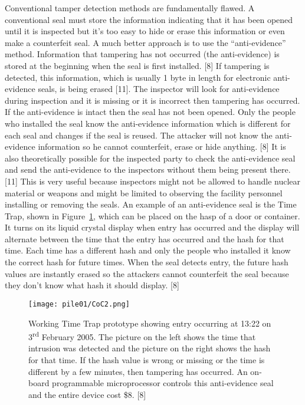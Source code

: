 \documentclass[twocolumn,a4paper]{article}
\begin{document}
Conventional tamper detection methods are fundamentally flawed. A
conventional seal must store the information indicating that it has
been opened until it is inspected but it’s too easy to hide or erase
this information or even make a counterfeit seal. A much better
approach is to use the ``anti-evidence'' method. Information that
tampering has not occurred (the anti-evidence) is stored at the
beginning when the seal is first installed. [8] If tampering is
detected, this information, which is usually 1 byte in length for
electronic anti-evidence seals, is being erased [11].  The inspector
will look for anti-evidence during inspection and it is missing or it
is incorrect then tampering has occurred. If the anti-evidence is
intact then the seal has not been opened. Only the people who
installed the seal know the anti-evidence information which is
different for each seal and changes if the seal is reused. The
attacker will not know the anti-evidence information so he cannot
counterfeit, erase or hide anything. [8] It is also theoretically
possible for the inspected party to check the anti-evidence seal and
send the anti-evidence to the inspectors without them being present
there. [11] This is very useful because inspectors might not be
allowed to handle nuclear material or weapons and might be limited to
observing the facility personnel installing or removing the seals. An
example of an anti-evidence seal is the Time Trap, shown in
Figure~\ref{fig:CoC2}, which can be placed on the hasp of a door or
container. It turns on its liquid crystal display when entry has
occurred and the display will alternate between the time that the
entry has occurred and the hash for that time. Each time has a
different hash and only the people who installed it know the correct
hash for future times. When the seal detects entry, the future hash
values are instantly erased so the attackers cannot counterfeit the
seal because they don't know what hash it should display. [8]

\begin{figure}
  \texttt{[image: pile01/CoC2.png]}
  \caption{Working Time Trap prototype showing entry occurring at
    13:22 on 3\textsuperscript{rd} February 2005. The picture on the
    left shows the time that intrusion was detected and the picture on
    the right shows the hash for that time. If the hash value is wrong
    or missing or the time is different by a few minutes, then
    tampering has occurred. An on-board programmable microprocessor
    controls this anti-evidence seal and the entire device cost
    \$8. [8]}
  \label{fig:CoC2}
\end{figure}
\end{document}

